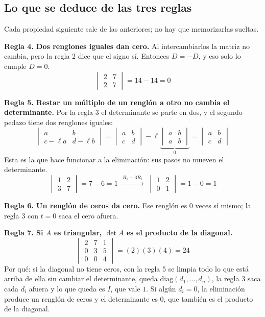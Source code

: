 \documentclass[11pt,letterpaper]{article}
\begin{document}
\subsection*{Lo que se deduce de las tres reglas}

Cada propiedad siguiente sale de las anteriores; no hay que
memorizarlas sueltas.

\textbf{Regla 4. Dos renglones iguales dan cero.} Al intercambiarlos
la matriz no cambia, pero la regla 2 dice que el signo sí. Entonces
$D = -D$, y eso solo lo cumple $D = 0$.
\[
    \begin{vmatrix} 2 & 7 \\ 2 & 7 \end{vmatrix} = 14 - 14 = 0
\]

\textbf{Regla 5. Restar un múltiplo de un renglón a otro no cambia el
determinante.} Por la regla 3 el determinante se parte en dos, y el
segundo pedazo tiene dos renglones iguales:
\[
    \begin{vmatrix} a & b \\ c - \ell a & d - \ell b \end{vmatrix}
    = \begin{vmatrix} a & b \\ c & d \end{vmatrix}
    - \ell \underbrace{\begin{vmatrix} a & b \\ a & b \end{vmatrix}}_{0}
    = \begin{vmatrix} a & b \\ c & d \end{vmatrix}
\]
Esta es la que hace funcionar a la eliminación: sus pasos no mueven el
determinante.
\[
    \begin{vmatrix} 1 & 2 \\ 3 & 7 \end{vmatrix} = 7 - 6 = 1
    \;\xrightarrow{\,R_2 - 3R_1\,}\;
    \begin{vmatrix} 1 & 2 \\ 0 & 1 \end{vmatrix} = 1 - 0 = 1
\]

\textbf{Regla 6. Un renglón de ceros da cero.} Ese renglón es $0$
veces sí mismo; la regla 3 con $t = 0$ saca el cero afuera.

\textbf{Regla 7. Si $A$ es triangular, $\det A$ es el producto de la
diagonal.}
\[
    \begin{vmatrix} 2 & 7 & 1 \\ 0 & 3 & 5 \\ 0 & 0 & 4 \end{vmatrix}
    = (2)(3)(4) = 24
\]
Por qué: si la diagonal no tiene ceros, con la regla 5 se limpia todo
lo que está arriba de ella sin cambiar el determinante, queda
$\mathrm{diag}(d_1, \ldots, d_n)$, la regla 3 saca cada $d_i$ afuera
y lo que queda es $I$, que vale $1$. Si algún $d_i = 0$, la
eliminación produce un renglón de ceros y el determinante es $0$, que
también es el producto de la diagonal.
\end{document}
